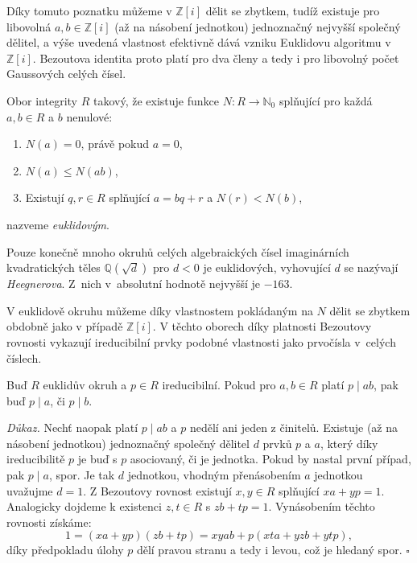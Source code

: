 \documentclass[12pt]{report}
\begin{document}
Díky tomuto poznatku můžeme v $\mathbb{Z}[i]$ dělit se zbytkem, tudíž existuje pro libovolná $a,b  \in \mathbb{Z}[i]$ (až na násobení jednotkou) jednoznačný nejvyšší společný dělitel, a výše uvedená vlastnost efektivně dává vzniku Euklidovu algoritmu v $\mathbb{Z}[i]$. Bezoutova identita proto platí pro dva členy a tedy i pro libovolný počet Gaussových celých čísel.
\begin{definice}
Obor integrity $R$ takový, že existuje funkce $N : R \longrightarrow \mathbb{N}_0$ splňující pro každá $a,b \in R$ a $b$ nenulové:
\begin{enumerate}
\item $N(a) = 0$, právě pokud $a = 0$,
\item $N(a) \leqslant N(ab)$,
\item Existují $q,r \in R$ splňující $a = bq + r$ a $N(r) < N(b)$,
\end{enumerate}
nazveme \textit{euklidovým}.
\end{definice}

\begin{poznamka}
Pouze konečně mnoho okruhů celých algebraických čísel imaginárních kvadratických těles $\mathbb{Q}(\sqrt{d})$ pro $d<0$ je euklidových, vyhovující $d$ se nazývají \textit{Heegnerova}. Z~nich v~absolutní hodnotě nejvyšší je $-163$.
\end{poznamka}

V euklidově okruhu můžeme díky vlastnostem pokládaným na $N$ dělit se zbytkem obdobně jako v případě $\mathbb{Z}[i]$. V těchto oborech díky platnosti Bezoutovy rovnosti vykazují ireducibilní prvky podobné vlastnosti jako prvočísla v~celých číslech.

\begin{veta}
Buď $R$ euklidův okruh a $p \in R$ ireducibilní. Pokud pro $a,b \in R$ platí $p \mid ab$, pak buď $p \mid a$, či $p \mid b$.
\end{veta}
\noindent \textit{Důkaz.} Nechť naopak platí $p \mid ab$ a $p$ nedělí ani jeden z činitelů. Existuje (až na násobení jednotkou) jednoznačný společný dělitel $d$ prvků $p$ a $a$, který díky ireducibilitě $p$ je buď s $p$ asociovaný, či je jednotka. Pokud by nastal první případ, pak $p \mid a$, spor. Je tak $d$ jednotkou, vhodným přenásobením $a$ jednotkou uvažujme $d = 1$. Z Bezoutovy rovnost existují $x,y \in R$ splňující $xa+yp = 1$. Analogicky dojdeme k existenci $z,t \in R$ s $zb+tp = 1$. Vynásobením těchto rovnosti získáme:
\begin{equation*}
1 = (xa+yp)(zb+tp) = xyab + p(xta+yzb+ytp),
\end{equation*}
díky předpokladu úlohy $p$ dělí pravou stranu a tedy i levou, což je hledaný spor. \hfill $\square$\\
\end{document}
